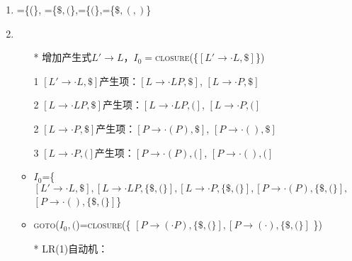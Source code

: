 \documentclass[a4paper, justified]{tufte-handout}
\begin{document}
\begin{solution}
\begin{enumerate}[(1)]
    \item {}=\{(\}, =\{$\$,($\},=\{$($\},=\{$\$,(,)$\}
    \item  
    \begin{itemize}
        \item[*] 增加产生式$L'\to L$，$I_0=$\textsc{closure}(\{$[L'\to \cdot L,\$]$\})
        \item[1] $[L'\to \cdot L,\$]$产生项：$[L\to \cdot LP,\$]$, $[L\to \cdot P,\$]$
        \item[2] $[L\to \cdot LP,\$]$产生项：$[L\to \cdot LP,(]$, $[L\to \cdot P,(]$
        \item[2] $[L\to \cdot P,\$]$产生项：$[P\to \cdot (P),\$]$, $[P\to \cdot (),\$]$
        \item[3] $[L\to \cdot P,(]$产生项：$[P\to \cdot (P),(]$, $[P\to \cdot (),(]$
        \item $I_0$=\Big\{ $[L'\to \cdot L,\$], [L\to \cdot LP,\{\$,(\}],[L\to \cdot P,\{\$,(\}],[P\to \cdot (P),\{\$,(\}],$ \\$[P\to \cdot (),\{\$,(\}]$\Big\}
        \item \textsc{goto}($I_0,($)=\textsc{closure}(\big\{ $[P\to (\cdot P),\{\$,(\}], [P\to (\cdot),\{\$,(\}]$ \big\})
        \item[*] LR(1)自动机：\\
        \begin{tikzpicture}[->,>=stealth',shorten >=1pt,node distance=4cm,on grid,scale = 1, auto]
            

\end{tikzpicture}
\end{itemize}
\end{enumerate}
\end{solution}
\end{document}
